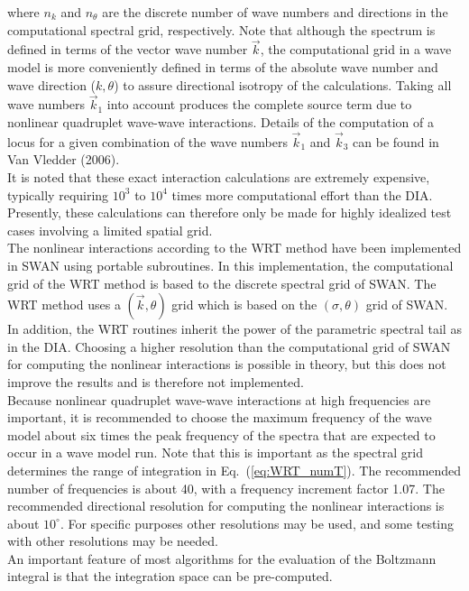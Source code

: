 \documentclass[12pt]{book}
\begin{document}
where $n_k$ and $n_\theta$ are the discrete number of wave numbers and
directions in the computational spectral grid, respectively. Note that although
the spectrum is defined in terms of the vector wave number $\vec{k}$, the
computational grid in a wave model is more conveniently defined in
terms of the absolute wave number and wave direction ($k,\theta$) to
assure directional isotropy of the calculations. Taking all wave
numbers $\vec{k}_1 $ into account produces the complete source term due to
nonlinear quadruplet wave-wave interactions. Details of the
computation of a locus for a given combination of the wave numbers
$\vec{k}_1 $  and $\vec{k}_3 $ can be found in Van Vledder (2006).
\\[2ex]
\noindent
It is noted that these exact interaction calculations are
extremely expensive, typically requiring $10^3$ to $10^4$ times more
computational effort than the DIA. Presently, these calculations can
therefore only be made for highly idealized test cases involving a
limited spatial grid.
\\[2ex]
\noindent
The nonlinear interactions according to the WRT method have been
implemented in SWAN using portable subroutines.
In this implementation, the computational grid of the
WRT method is based to the discrete spectral grid of SWAN.
The WRT method uses a $(\vec{k},\theta)$ grid which is based on the
$(\sigma,\theta)$ grid of SWAN.
In addition, the WRT routines inherit the power of the parametric
spectral tail as in the DIA. Choosing a higher resolution than the computational
grid of SWAN for computing the nonlinear interactions is possible in theory, but this
does not improve the results and is therefore not implemented.
\\[2ex]
\noindent
Because nonlinear quadruplet wave-wave interactions at high
frequencies are important, it is recommended to choose the maximum
frequency of the wave model about six times the peak frequency of the
spectra that are expected to occur in a wave model run. Note that this is important
as the spectral grid determines the range of integration in Eq.~(\ref{eq:WRT_numT}).
The recommended number of frequencies is about 40, with a frequency increment factor
1.07. The recommended directional resolution
for computing the nonlinear interactions is about $10^\circ$. For
specific purposes other resolutions may be used, and some
testing with other resolutions may be needed.
\\[2ex]
\noindent
An important feature of most algorithms for the evaluation of the
Boltzmann integral is that the integration space can be pre-computed.
\end{document}
